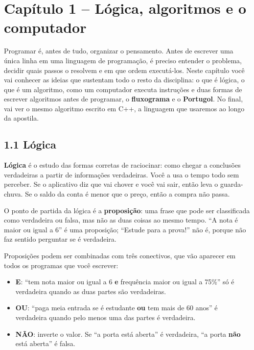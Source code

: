 \section{Capítulo 1 -- Lógica, algoritmos e o computador}

Programar é, antes de tudo, organizar o pensamento. Antes de escrever uma única linha em uma linguagem de programação, é preciso entender o problema, decidir quais passos o resolvem e em que ordem executá-los. Neste capítulo você vai conhecer as ideias que sustentam todo o resto da disciplina: o que é lógica, o que é um algoritmo, como um computador executa instruções e duas formas de escrever algoritmos antes de programar, o \textbf{fluxograma} e o \textbf{Portugol}. No final, vai ver o mesmo algoritmo escrito em C++, a linguagem que usaremos ao longo da apostila.

\subsection{1.1 Lógica}

\textbf{Lógica} é o estudo das formas corretas de raciocinar: como chegar a conclusões verdadeiras a partir de informações verdadeiras. Você a usa o tempo todo sem perceber. Se o aplicativo diz que vai chover e você vai sair, então leva o guarda-chuva. Se o saldo da conta é menor que o preço, então a compra não passa.

O ponto de partida da lógica é a \textbf{proposição}: uma frase que pode ser classificada como verdadeira ou falsa, mas não as duas coisas ao mesmo tempo. ``A nota é maior ou igual a 6'' é uma proposição; ``Estude para a prova!'' não é, porque não faz sentido perguntar se é verdadeira.

Proposições podem ser combinadas com três conectivos, que vão aparecer em todos os programas que você escrever:

\begin{itemize}
  \item \textbf{E}: ``tem nota maior ou igual a 6 \textbf{e} frequência maior ou igual a 75\%'' só é verdadeira quando as duas partes são verdadeiras.
  \item \textbf{OU}: ``paga meia entrada se é estudante \textbf{ou} tem mais de 60 anos'' é verdadeira quando pelo menos uma das partes é verdadeira.
  \item \textbf{NÃO}: inverte o valor. Se ``a porta está aberta'' é verdadeira, ``a porta \textbf{não} está aberta'' é falsa.
\end{itemize}

